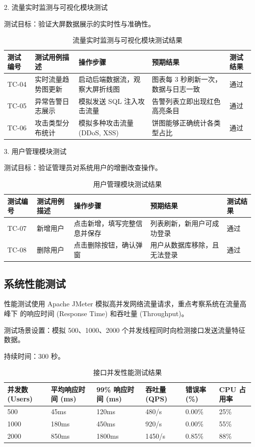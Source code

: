2. 流量实时监测与可视化模块测试

测试目标：验证大屏数据展示的实时性与准确性。

\begin{table}[htbp]
\centering
\caption{流量实时监测与可视化模块测试结果}
\begin{tabular}{p{1.5cm} p{3.5cm} p{3cm} p{3.5cm} p{1.5cm}}
\toprule
测试编号 & 测试用例描述 & 操作步骤 & 预期结果 & 测试结果 \\
\midrule
TC-04 & 实时流量趋势图更新 & 启动后端数据流，观察大屏折线图 & 图表每 3 秒刷新一次，数据与日志一致 & 通过 \\
TC-05 & 异常告警日志展示 & 模拟发送 SQL 注入攻击流量 & 告警列表立即出现红色高亮条目 & 通过 \\
TC-06 & 攻击类型分布统计 & 模拟多种攻击流量 (DDoS, XSS) & 饼图能够正确统计各类型占比 & 通过 \\
\bottomrule
\end{tabular}
\end{table}

3. 用户管理模块测试

测试目标：验证管理员对系统用户的增删改查操作。

\begin{table}[htbp]
\centering
\caption{用户管理模块测试结果}
\begin{tabular}{p{1.5cm} p{3.5cm} p{3cm} p{3.5cm} p{1.5cm}}
\toprule
测试编号 & 测试用例描述 & 操作步骤 & 预期结果 & 测试结果 \\
\midrule
TC-07 & 新增用户 & 点击新增，填写完整信息并保存 & 列表刷新，新用户可成功登录 & 通过 \\
TC-08 & 删除用户 & 点击删除按钮，确认弹窗 & 用户从数据库移除，且无法登录 & 通过 \\
\bottomrule
\end{tabular}
\end{table}

\subsection{系统性能测试}

性能测试使用 Apache JMeter 模拟高并发网络流量请求，重点考察系统在流量高峰下
的响应时间 (Response Time) 和吞吐量 (Throughput)。

测试场景设置：模拟 500、1000、2000 个并发线程同时向检测接口发送流量特征数据。

持续时间：300 秒。

\begin{table}[htbp]
\centering
\caption{接口并发性能测试结果}
\label{tab:5-4}
\begin{tabular}{p{2cm} p{2.5cm} p{2.8cm} p{2.2cm} p{2cm} p{2cm}}
\toprule
并发数 (Users) & 平均响应时间 (ms) & 99\% 响应时间 (ms) & 吞吐量 (QPS) & 错误率 (\%) & CPU 占用率 \\
\midrule
500  & 45ms  & 120ms  & 480/s  & 0.00\% & 25\% \\
1000 & 180ms & 450ms  & 920/s  & 0.00\% & 55\% \\
2000 & 850ms & 1800ms & 1450/s & 0.85\% & 88\% \\
\bottomrule
\end{tabular}
\end{table}

